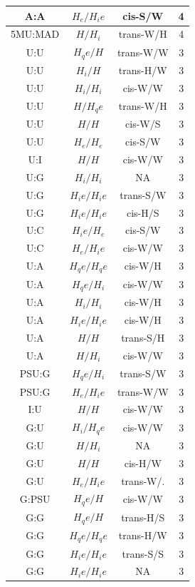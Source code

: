 \begin{center}
\begin{longtable}{c|c|c|c}
A:A & $H_e/H_ie$ & cis-S/W & 4 \\  \hline
5MU:MAD & $H/H_i$ & trans-W/H & 4 \\  \hline
U:U & $H_qe/H$ & trans-W/W & 3 \\  \hline
U:U & $H_i/H$ & trans-H/W & 3 \\  \hline
U:U & $H_i/H_i$ & cis-W/W & 3 \\  \hline
U:U & $H/H_qe$ & trans-W/H & 3 \\  \hline
U:U & $H/H$ & cis-W/S & 3 \\  \hline
U:U & $H_e/H_e$ & cis-S/W & 3 \\  \hline
U:I & $H/H$ & cis-W/W & 3 \\  \hline
U:G & $H_i/H_i$ & NA & 3 \\  \hline
U:G & $H_ie/H_ie$ & trans-S/W & 3 \\  \hline
U:G & $H_ie/H_ie$ & cis-H/S & 3 \\  \hline
U:C & $H_ie/H_e$ & cis-S/W & 3 \\  \hline
U:C & $H_e/H_ie$ & cis-W/W & 3 \\  \hline
U:A & $H_qe/H_qe$ & cis-W/H & 3 \\  \hline
U:A & $H_qe/H_i$ & cis-W/W & 3 \\  \hline
U:A & $H_i/H_i$ & cis-W/H & 3 \\  \hline
U:A & $H_ie/H_ie$ & cis-W/H & 3 \\  \hline
U:A & $H/H$ & trans-S/H & 3 \\  \hline
U:A & $H/H_i$ & cis-W/W & 3 \\  \hline
PSU:G & $H_qe/H_i$ & trans-S/W & 3 \\  \hline
PSU:G & $H_e/H_ie$ & trans-W/W & 3 \\  \hline
I:U & $H/H$ & cis-W/W & 3 \\  \hline
G:U & $H_i/H_qe$ & cis-W/W & 3 \\  \hline
G:U & $H/H_i$ & NA & 3 \\  \hline
G:U & $H/H$ & cis-H/W & 3 \\  \hline
G:U & $H_e/H_ie$ & trans-W/. & 3 \\  \hline
G:PSU & $H_qe/H$ & cis-W/W & 3 \\  \hline
G:G & $H_qe/H$ & trans-H/S & 3 \\  \hline
G:G & $H_qe/H_qe$ & trans-H/W & 3 \\  \hline
G:G & $H_ie/H_ie$ & trans-S/S & 3 \\  \hline
G:G & $H_ie/H_ie$ & NA & 3 \\  \hline

\end{longtable}
\end{center}
